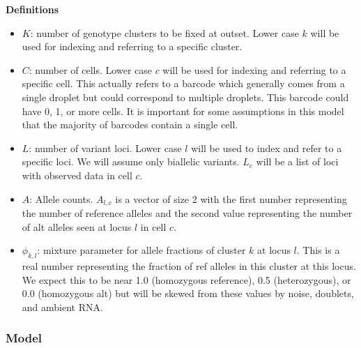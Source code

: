 \textbf{Definitions}
\begin{itemize}
\item $K$: number of genotype clusters to be fixed at outset. Lower case $k$ will be used for indexing and referring to a specific cluster.
\item $C$: number of cells. Lower case $c$ will be used for indexing and referring to a specific cell. This actually refers to a barcode which generally comes from a single droplet but could correspond to multiple droplets. This barcode could have 0, 1, or more cells. It is important for some assumptions in this model that the majority of barcodes contain a single cell.
\item $L$: number of variant loci. Lower case $l$ will be used to index and refer to a specific loci. We will assume only biallelic variants. $L_c$ will be a list of loci with observed data in cell $c$.
\item $A$: Allele counts. $A_{l,c}$ is a vector of size 2 with the first number representing the number of reference alleles and the second value representing the number of alt alleles seen at locus $l$ in cell $c$.
\item $\phi_{k,l}$: mixture parameter for allele fractions of cluster $k$ at locus $l$. This is a real number representing the fraction of ref alleles in this cluster at this locus. We expect this to be near 1.0 (homozygous reference), 0.5 (heterozygous), or 0.0 (homozygous alt) but will be skewed from these values by noise, doublets, and ambient RNA.
\end{itemize} 

\noindent
\subsubsection{Model}

